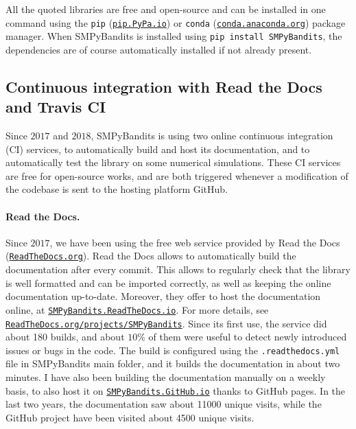 All the quoted libraries are free and open-source and can be installed in one command using the \texttt{pip} (\texttt{\href{https://pip.pypa.io/}{pip.PyPa.io}}) or \texttt{conda} (\texttt{\href{http://conda.anaconda.org/}{conda.anaconda.org}}) package manager.
%
When SMPyBandits is installed using \texttt{pip install SMPyBandits}, the dependencies are of course automatically installed if not already present.


\subsection{Continuous integration with Read the Docs and Travis CI}

Since $2017$ and $2018$, SMPyBandits is using two online continuous integration (CI) services, to automatically build and host its documentation, and to automatically test the library on some numerical simulations.
%
These CI services are free for open-source works, and are both triggered whenever a modification of the codebase is sent to the hosting platform GitHub.

\paragraph{Read the Docs.}
Since $2017$, we have been using the free web service provided by Read the Docs (\href{https://readthedocs.org/}{\texttt{ReadTheDocs.org}}).
Read the Docs allows to automatically build the documentation after every commit. This allows to regularly check that the library is well formatted and can be imported correctly, as well as keeping the online documentation up-to-date.
Moreover, they offer to host the documentation online, at \href{https://smpybandits.rtfd.io/}{\texttt{SMPyBandits.ReadTheDocs.io}}.
For more details, see \href{https://readthedocs.org/projects/smpybandits/}{\texttt{ReadTheDocs.org/projects/SMPyBandits}}.
%
Since its first use, the service did about 180 builds, and about $10\%$ of them were useful to detect newly introduced issues or bugs in the code.
The build is configured using the \texttt{.readthedocs.yml} file in SMPyBandits main folder, and it builds the documentation in about two minutes.
I have also been building the documentation manually on a weekly basis, to also host it on \href{https://smpybandits.github.io/}{\texttt{SMPyBandits.GitHub.io}} thanks to GitHub pages.
In the last two years, the documentation saw about 11000 unique visits, while the GitHub project have been visited about 4500 unique visits.


